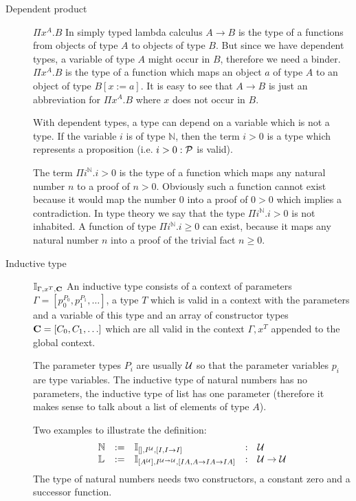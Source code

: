 \begin{description}
\item[Dependent product] $\Pi x^A.B$ In simply typed lambda calculus
  $A \to B$ is the type of a functions from objects of type $A$ to objects of
  type $B$. But since we have dependent types, a variable of type $A$ might
  occur in $B$, therefore we need a binder. $\Pi x^A. B$ is the type of a
  function which maps an object $a$ of type $A$ to an object of type
  $B[x:=a]$. It is easy to see that $A \to B$ is just an abbreviation for
  $\Pi x^A.B$ where $x$ does not occur in $B$.

  With dependent types, a type can depend on a variable which is not a
  type. If the variable $i$ is of type $\mathbb{N}$, then the term $i > 0$ is
  a type which represents a proposition (i.e. $i > 0: {\cal{P}}$ is valid).

  The term $\Pi i^{\mathbb{N}}. i > 0$ is the type of a function which maps
  any natural number $n$ to a proof of $n > 0$. Obviously such a function
  cannot exist because it would map the number $0$ into a proof of $0 > 0$
  which implies a contradiction. In type theory we say that the type
  $\Pi i^{\mathbb{N}}. i > 0$ is not inhabited. A function of type
  $\Pi i^{\mathbb{N}}. i \ge 0$ can exist, because it maps any natural number
  $n$ into a proof of the trivial fact $n \ge 0$.

\item[Inductive type] $\mathbb{I}_{\Gamma,x^T,\mathbf{C}}$ An inductive type
  consists of a context of parameters
  $\Gamma = [p_0^{P_0}, p_1^{P_1}, \ldots]$, a type $T$ which is valid in a
  context with the parameters and a variable of this type and an array of
  constructor types $\mathbf{C} = [C_0, C_1, \ldots]$ which are all valid in the
  context $\Gamma, x^T$ appended to the global context.

  The parameter types $P_i$ are usually ${\cal{U}}$ so that the parameter variables
  $p_i$ are type variables. The inductive type of natural numbers has no
  parameters, the inductive type of list has one parameter (therefore it makes
  sense to talk about a list of elements of type $A$).

  Two examples to illustrate the definition:
  $$
  \begin{array}{lllll}
    \mathbb{N}
    &:=& \mathbb{I}_{[], I^{\cal{U}}, [I, I \to I]}
    &:& {\cal{U}}
    \\
    \mathbb{L}
    &:=& \mathbb{I}_{[A^{\cal{U}}],  I^{{\cal{U}}\to{\cal{U}}},  [IA, A \to IA \to IA]}
    &:& {\cal{U}} \to {\cal{U}}
  \end{array}
  $$
  The type of natural numbers needs two constructors, a constant zero and a
  successor function.


\end{description}
